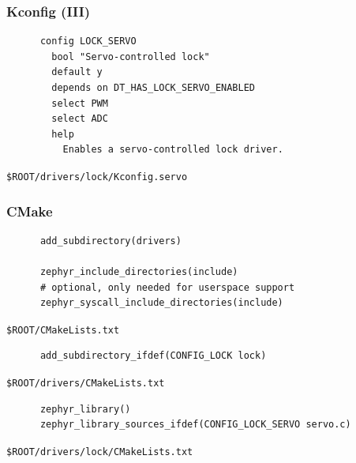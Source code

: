 \documentclass[handout]{beamer}
\begin{document}
\begin{frame}[fragile]
  \frametitle{Kconfig (III)}
  \begin{listing}[H]
    \begin{verbatim}
      config LOCK_SERVO
        bool "Servo-controlled lock"
        default y
        depends on DT_HAS_LOCK_SERVO_ENABLED
        select PWM
        select ADC
        help
          Enables a servo-controlled lock driver.

    \end{verbatim}
    \caption{\texttt{\$ROOT/drivers/lock/Kconfig.servo}}
  \end{listing}
\end{frame}

\begin{frame}[fragile]
  \frametitle{CMake}

  \begin{listing}[H]
    \begin{verbatim}
      add_subdirectory(drivers)

      zephyr_include_directories(include)
      # optional, only needed for userspace support
      zephyr_syscall_include_directories(include)
    \end{verbatim}
    \caption{\texttt{\$ROOT/CMakeLists.txt}}
  \end{listing}

  \begin{listing}[H]
    \begin{verbatim}
      add_subdirectory_ifdef(CONFIG_LOCK lock)
    \end{verbatim}
    \caption{\texttt{\$ROOT/drivers/CMakeLists.txt}}
  \end{listing}

  \begin{listing}[H]
    \begin{verbatim}
      zephyr_library()
      zephyr_library_sources_ifdef(CONFIG_LOCK_SERVO servo.c)
    \end{verbatim}
    \caption{\texttt{\$ROOT/drivers/lock/CMakeLists.txt}}
  \end{listing}
\end{frame}
\end{document}
